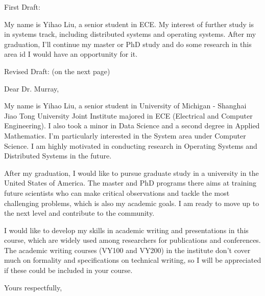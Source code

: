\documentclass{letter}
\begin{document}
First Draft:

My name is Yihao Liu, a senior student in ECE. My interest of further study is in systems track, including distributed systems and operating systems. After my graduation, I'll continue my master or PhD study and do some research in this area id I would have an opportunity for it.

\bigskip

Revised Draft: (on the next page)

\begin{letter}{}

\opening{Dear Dr. Murray,}

My name is Yihao Liu, a senior student in University of Michigan - Shanghai Jiao Tong University Joint Institute majored in ECE (Electrical and Computer Engineering). I also took a minor in Data Science and a second degree in Applied Mathematics. I'm particularly interested in the System area under Computer Science. I am highly motivated in conducting research in Operating Systems and Distributed Systems in the future.

After my graduation, I would like to pursue graduate study in a university in the United States of America. The master and PhD programs there aims at training future scientists who can make critical observations and tackle the most challenging problems, which is also my academic goals. I am ready to move up to the next level and contribute to the community.

I would like to develop my skills in academic writing and presentations in this course, which are  widely used among researchers for publications and conferences. The academic writing courses (VY100 and VY200) in the institute don't cover much on formality and specifications on technical writing, so I will be appreciated if these could be included in your course.

\closing{Yours respectfully,}

\end{letter}
\end{document}
